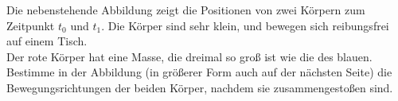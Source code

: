 \begin{minipage}[b]{0.7\textwidth}
\begin{Exercise}[label = col1, title = Stoßaufnahme, origin = Aaron Wild, difficulty = 5]
	Die nebenstehende Abbildung zeigt die Positionen von zwei Körpern zum Zeitpunkt $t_0$ und $t_1$. Die Körper sind sehr klein, und bewegen sich reibungsfrei auf einem Tisch.\\
	Der rote Körper hat eine Masse, die dreimal so groß ist wie die des blauen.\\
	Bestimme in der Abbildung (in größerer Form auch auf der nächsten Seite) die Bewegungsrichtungen der beiden Körper, nachdem sie zusammengestoßen sind.
\end{Exercise}
\end{minipage}
\begin{minipage}[b]{0.3\textwidth}
	\flushright
	
\end{minipage}